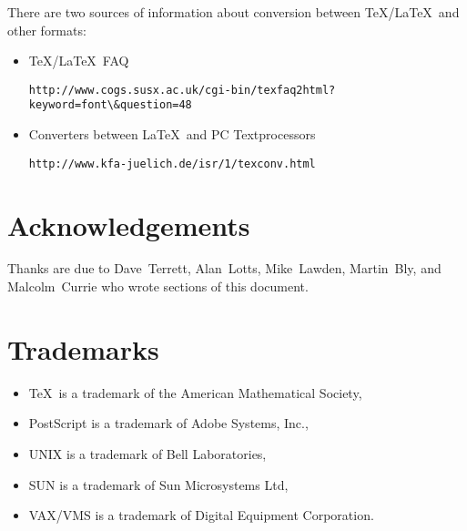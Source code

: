 \documentclass[11pt,twoside]{article}
\newcommand{\htmladdnormallink}[2]{#1}
\newenvironment{latexonly}{}{}
\newcommand{\xlabel}[1]{}
\begin{document}
There are two sources of information about conversion between \TeX/\LaTeX\ and 
other formats:

\begin{itemize}
  \item \htmladdnormallink{\TeX/\LaTeX\ FAQ}
    {http://www.cogs.susx.ac.uk/cgi-bin/texfaq2html?keyword=font&question=48}
    \begin{latexonly}
      \begin{verbatim}
http://www.cogs.susx.ac.uk/cgi-bin/texfaq2html?keyword=font\&question=48
      \end{verbatim}
    \end{latexonly}
  \item \htmladdnormallink{Converters between \LaTeX\ and PC Textprocessors}
    {http://www.kfa-juelich.de/isr/1/texconv.html}
    \begin{latexonly}
      \begin{verbatim}
http://www.kfa-juelich.de/isr/1/texconv.html
      \end{verbatim}
    \end{latexonly}
\end{itemize}


\section{\xlabel{acknowledgements}\label{acknowledgements}Acknowledgements}

Thanks are due to Dave~Terrett, Alan~Lotts, Mike~Lawden, Martin~Bly,  
and Malcolm~Currie who wrote sections of this document. 

\section{\xlabel{trademarks}\label{trademarks}Trademarks}
\begin{itemize}
\item \TeX\ is a trademark of the American Mathematical Society,
\item PostScript is a trademark of Adobe Systems, Inc.,
\item UNIX is a trademark of Bell Laboratories,
\item SUN is a trademark of Sun Microsystems Ltd,
\item VAX/VMS is a trademark of Digital Equipment Corporation.
\end{itemize}

\newpage
{}~

\typeout{}
\typeout{}
\typeout{}
\typeout{}
\end{document}
